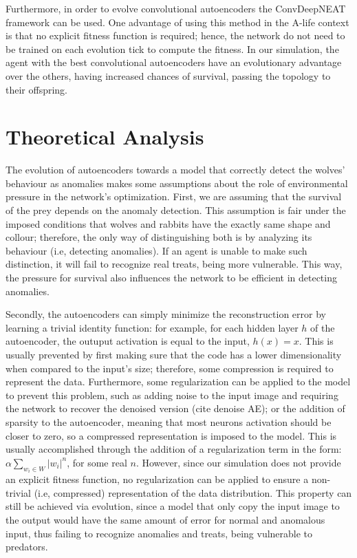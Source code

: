 \documentclass[letterpaper]{article}
\numberwithin{equation}{section}
\numberwithin{theorem}{section}
\numberwithin{lemma}{section}
\numberwithin{df}{section}
\begin{document}
Furthermore, in order to evolve convolutional autoencoders the ConvDeepNEAT framework can be used. One advantage of using this method in the A-life context is that no explicit fitness function is required; hence, the network do not need to be trained on each evolution tick to compute the fitness. In our simulation, the agent with the best convolutional autoencoders have an evolutionary advantage over the others, having increased chances of survival, passing the topology to their offspring.



\section{Theoretical Analysis}

The evolution of autoencoders towards a model that correctly detect the wolves' behaviour as anomalies makes some assumptions about the role of environmental pressure in the network's optimization. First, we are assuming that the survival of the prey depends on the anomaly detection. This assumption is fair under the imposed conditions that wolves and rabbits have the exactly same shape and collour; therefore, the only way of distinguishing both is by analyzing its behaviour (i.e, detecting anomalies). If an agent is unable to make such distinction, it will fail to recognize real treats, being more vulnerable. This way, the pressure for survival also influences the network to be efficient in detecting anomalies.

Secondly, the autoencoders can simply minimize the reconstruction error by learning a trivial identity function: for example, for each hidden layer $h$ of the autoencoder, the outuput activation is equal to the input, $h(x) = x$. This is usually prevented by first making sure that the code has a lower dimensionality when compared to the input's size; therefore, some compression is required to represent the data. Furthermore, some regularization can be applied to the model to prevent this problem, such as adding noise to the input image and requiring the network to recover the denoised version (cite denoise AE); or the addition of sparsity to the autoencoder, meaning that most neurons activation should be closer to zero, so a compressed representation is imposed to the model. This is usually accomplished through the addition of a regularization term in the form: $\alpha \sum_{w_i \in W} |w_i| ^ n$, for some real $n$. However, since our simulation does not provide an explicit fitness function, no regularization can be applied to ensure a non-trivial (i.e, compressed) representation of the data distribution. This property can still be achieved via evolution, since a model that only copy the input image to the output would have the same amount of error for normal and anomalous input, thus failing to recognize anomalies and treats, being vulnerable to predators.
\end{document}
